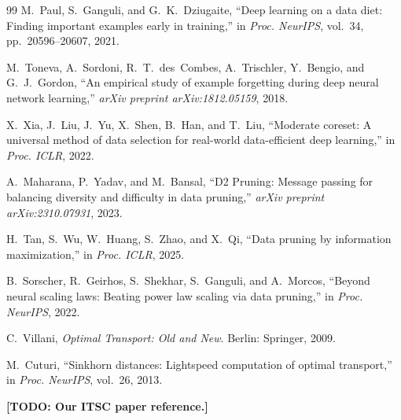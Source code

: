 \documentclass[journal]{IEEEtran}
\newcommand{\todo}[1]{{\color{red}\textbf{[TODO: #1]}}}
\begin{document}
\begin{thebibliography}{99}
M.~Paul, S.~Ganguli, and G.~K.~Dziugaite,
``Deep learning on a data diet: Finding important examples early in training,''
in \emph{Proc. NeurIPS}, vol.~34, pp.~20596--20607, 2021.

M.~Toneva, A.~Sordoni, R.~T.~des~Combes, A.~Trischler, Y.~Bengio,
and G.~J.~Gordon,
``An empirical study of example forgetting during deep neural network learning,''
\emph{arXiv preprint arXiv:1812.05159}, 2018.

X.~Xia, J.~Liu, J.~Yu, X.~Shen, B.~Han, and T.~Liu,
``Moderate coreset: A universal method of data selection for real-world data-efficient deep learning,''
in \emph{Proc. ICLR}, 2022.

A.~Maharana, P.~Yadav, and M.~Bansal,
``D2 Pruning: Message passing for balancing diversity and difficulty in data pruning,''
\emph{arXiv preprint arXiv:2310.07931}, 2023.

H.~Tan, S.~Wu, W.~Huang, S.~Zhao, and X.~Qi,
``Data pruning by information maximization,''
in \emph{Proc. ICLR}, 2025.

B.~Sorscher, R.~Geirhos, S.~Shekhar, S.~Ganguli, and A.~Morcos,
``Beyond neural scaling laws: Beating power law scaling via data pruning,''
in \emph{Proc. NeurIPS}, 2022.

C.~Villani,
\emph{Optimal Transport: Old and New}.
Berlin: Springer, 2009.

M.~Cuturi,
``Sinkhorn distances: Lightspeed computation of optimal transport,''
in \emph{Proc. NeurIPS}, vol.~26, 2013.

\todo{Our ITSC paper reference.}

\end{thebibliography}
\end{document}
